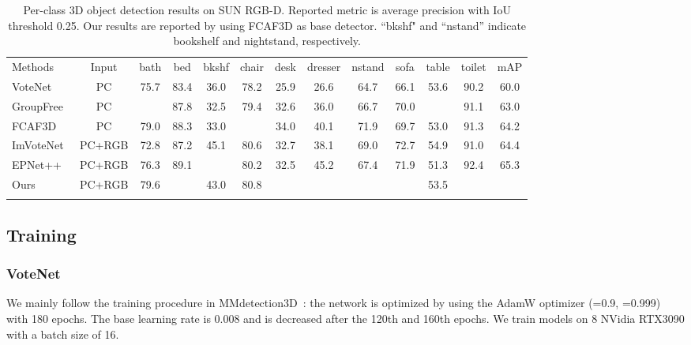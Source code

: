 \documentclass[runningheads]{llncs}
\begin{document}
\setlength{\tabcolsep}{1.4pt}
\begin{table}
\renewcommand\arraystretch{1.5}  \scriptsize
\begin{center}
\caption{Per-class  3D  object  detection  results  on  SUN RGB-D. Reported metric is average precision with IoU threshold 0.25. Our results are reported by using FCAF3D as base detector. ``bkshf" and ``nstand'' indicate bookshelf and nightstand, respectively.}
\vspace{6pt}
\label{table:per_class_25}
\begin{tabular}{lcccccccccccc}
\Xhline{0.8pt}\noalign{\smallskip}
Methods&Input&bath&bed&bkshf&chair&desk&dresser&nstand&sofa&table&toilet&mAP \\
\noalign{\smallskip}
\hline
\noalign{\smallskip}
VoteNet~\cite{qi2019deep}\footnotemark[1] & PC & 75.7 & 83.4 & 36.0 & 78.2 & 25.9 & 26.6 & 64.7 & 66.1 & 53.6 & 90.2 & 60.0 \\
GroupFree~\cite{liu2021group} & PC &   & 87.8 & 32.5 & 79.4 & 32.6 & 36.0 & 66.7 & 70.0 &  & 91.1 & 63.0 \\
FCAF3D~\cite{rukhovich2021fcaf3d} & PC & 79.0 & 88.3 & 33.0 &  & 34.0 & 40.1 & 71.9 & 69.7 & 53.0 & 91.3 & 64.2 \\
ImVoteNet\cite{qi2020imvotenet}\footnotemark[2] & PC+RGB & 72.8 & 87.2 & 45.1 & 80.6 & 32.7 & 38.1 & 69.0 & 72.7 & 54.9 & 91.0 & 64.4 \\
EPNet++~\cite{liu2022epnet} & PC+RGB & 76.3 & 89.1 &  & 80.2 & 32.5 & 45.2 & 67.4 & 71.9 & 51.3 & 92.4 & 65.3 \\
Ours & PC+RGB & 79.6 &  & 43.0 & 80.8 &  &  &  &  & 53.5 &  &  \\
\Xhline{0.8pt}
\end{tabular}
\end{center}
\end{table}
\setlength{\tabcolsep}{1.4pt}

\subsection{Training}
\subsubsection{VoteNet}
We mainly follow the training procedure in MMdetection3D~\cite{mmdet3d2020}: the network is optimized by using the AdamW optimizer (=0.9, =0.999) with 180 epochs. The base learning rate is 0.008 and is decreased after the 120th and 160th epochs. We train models on 8 NVidia RTX3090 with a batch size of 16.
\end{document}
